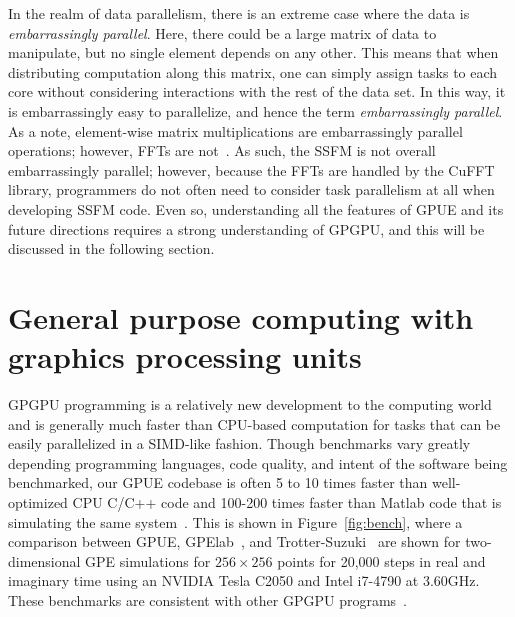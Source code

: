 In the realm of data parallelism, there is an extreme case where the data is \textit{embarrassingly parallel}.
Here, there could be a large matrix of data to manipulate, but no single element depends on any other.
This means that when distributing computation along this matrix, one can simply assign tasks to each core without considering interactions with the rest of the data set.
In this way, it is embarrassingly easy to parallelize, and hence the term \textit{embarrassingly parallel}.
As a note, element-wise matrix multiplications are embarrassingly parallel operations; however, FFTs are not~\cite{czechowski2012}.
As such, the SSFM is not overall embarrassingly parallel; however, because the FFTs are handled by the CuFFT library, programmers do not often need to consider task parallelism at all when developing SSFM code.
Even so, understanding all the features of GPUE and its future directions requires a strong understanding of GPGPU, and this will be discussed in the following section.

\section{General purpose computing with graphics processing units}

GPGPU programming is a relatively new development to the computing world and is generally much faster than CPU-based computation for tasks that can be easily parallelized in a SIMD-like fashion.
Though benchmarks vary greatly depending programming languages, code quality, and intent of the software being benchmarked, our GPUE codebase is often 5 to 10 times faster than well-optimized CPU C/C++ code and 100-200 times faster than Matlab code that is simulating the same system~\cite{wittek2016}.
This is shown in Figure~\ref{fig:bench}, where a comparison between GPUE, GPElab~\cite{antoine2014}, and Trotter-Suzuki~\cite{wittek2013} are shown for two-dimensional GPE simulations for $256 \times 256$ points for 20,000 steps in real and imaginary time using an NVIDIA Tesla C2050 and Intel i7-4790 at 3.60GHz.
These benchmarks are consistent with other GPGPU programs~\cite{garland2008, lee2010, nickolls2010}.

